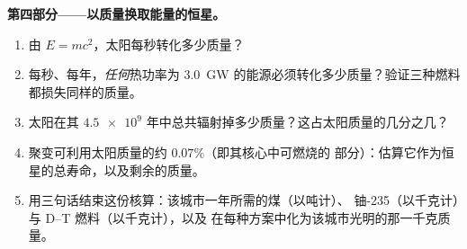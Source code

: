 \begin{problem}
\medskip
\noindent\textbf{第四部分——以质量换取能量的恒星。}
\begin{enumerate}[resume]
  \item 由 $E = mc^2$，太阳每秒转化多少质量？
  \item 每秒、每年，\emph{任何}热功率为
        \qty{3.0}{GW} 的能源必须转化多少质量？验证三种燃料
        都损失同样的质量。
  \item 太阳在其 $\num{4.5e9}$
        年中总共辐射掉多少质量？这占太阳质量的几分之几？
  \item 聚变可利用太阳质量的约 $0.07\%$（即其核心中可燃烧的
        部分）：估算它作为恒星的总寿命，以及剩余的质量。
  \item 用三句话结束这份核算：该城市一年所需的煤（以吨计）、
        铀-235（以千克计）与 D--T 燃料（以千克计），以及
        在每种方案中化为该城市光明的那一千克质量。
\end{enumerate}
\end{problem}
